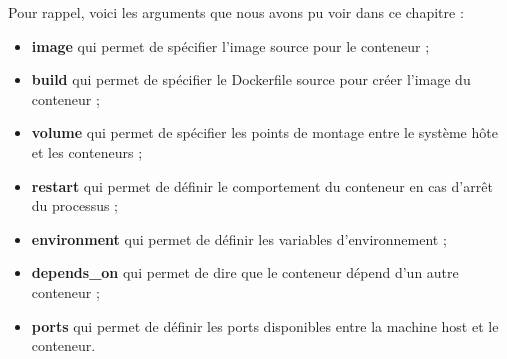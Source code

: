 \documentclass[12pt,a4paper]{article}
\begin{document}
Pour rappel, voici les arguments que nous avons pu voir dans ce chapitre :
\begin{itemize}
\item \textbf{image} qui permet de spécifier l'image source pour le conteneur ;
\item \textbf{build} qui permet de spécifier le Dockerfile source pour créer l'image du conteneur ;
\item \textbf{volume} qui permet de spécifier les points de montage entre le système hôte et les conteneurs ;
\item \textbf{restart} qui permet de définir le comportement du conteneur en cas d'arrêt du processus ;
\item \textbf{environment} qui permet de définir les variables d’environnement ;
\item \textbf{depends\_on} qui permet de dire que le conteneur dépend d'un autre conteneur ;
\item \textbf{ports} qui permet de définir les ports disponibles entre la machine host et le conteneur.
\end{itemize}
\end{document}
